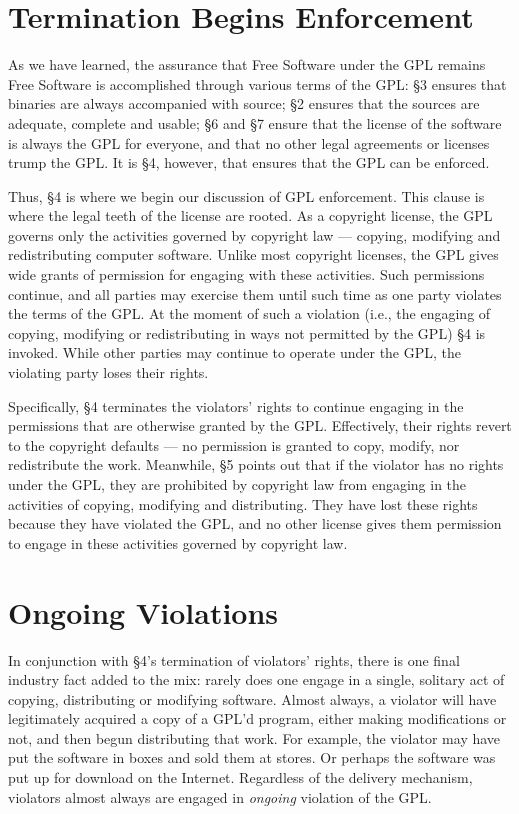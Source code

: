 \section{Termination Begins Enforcement}

As we have learned, the assurance that Free Software under the GPL remains
Free Software is accomplished through various terms of the GPL: \S 3 ensures
that binaries are always accompanied with source; \S 2 ensures that the
sources are adequate, complete and usable; \S 6 and \S 7 ensure that the
license of the software is always the GPL for everyone, and that no other
legal agreements or licenses trump the GPL. It is \S 4, however, that ensures
that the GPL can be enforced.

Thus, \S 4 is where we begin our discussion of GPL enforcement. This
clause is where the legal teeth of the license are rooted. As a copyright
license, the GPL governs only the activities governed by copyright law ---
copying, modifying and redistributing computer software. Unlike most
copyright licenses, the GPL gives wide grants of permission for engaging with
these activities. Such permissions continue, and all parties may exercise
them until such time as one party violates the terms of the GPL\@. At the
moment of such a violation (i.e., the engaging of copying, modifying or
redistributing in ways not permitted by the GPL) \S 4 is invoked. While other
parties may continue to operate under the GPL, the violating party loses their
rights.

Specifically, \S 4 terminates the violators' rights to continue
engaging in the permissions that are otherwise granted by the GPL\@.
Effectively, their rights revert to the copyright defaults ---
no permission is granted to copy, modify, nor redistribute the work.
Meanwhile, \S 5 points out that if the violator has no rights under
the GPL, they are prohibited by copyright law from engaging in the
activities of copying, modifying and distributing. They have lost
these rights because they have violated the GPL, and no other license
gives them permission to engage in these activities governed by copyright law.

\section{Ongoing Violations}

In conjunction with \S 4's termination of violators' rights, there is
one final industry fact added to the mix: rarely does one engage in a
single, solitary act of copying, distributing or modifying software.
Almost always, a violator will have legitimately acquired a copy of a
GPL'd program, either making modifications or not, and then begun
distributing that work. For example, the violator may have put the
software in boxes and sold them at stores. Or perhaps the software
was put up for download on the Internet. Regardless of the delivery
mechanism, violators almost always are engaged in {\em ongoing\/}
violation of the GPL\@.

